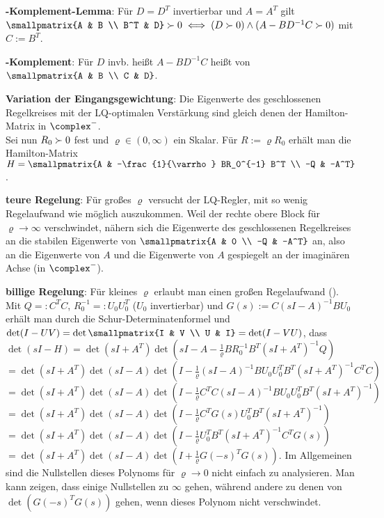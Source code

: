 \textbf{-Komplement-Lemma}:
Für $D = D^T$ invertierbar und $A = A^T$ gilt\\
$\smallpmatrix{A & B \\ B^T & D} \pd \iff (D \pd) \land (A - BD^{-1}C \pd)$
mit $C := B^T$.

\textbf{-Komplement}:
Für $D$ invb. heißt $A - BD^{-1}C$ heißt  von
$\smallpmatrix{A & B \\ C & D}$.

\linie

\textbf{Variation der Eingangsgewichtung}:
Die Eigenwerte des geschlossenen Regelkreises mit der LQ-optimalen Verstärkung sind gleich denen
der Hamilton-Matrix in $\complex^-$.\\
Sei nun $R_0 \succ 0$ fest und $\varrho \in (0, \infty)$ ein Skalar.
Für $R := \varrho R_0$ erhält man die Hamilton-Matrix
$H = \smallpmatrix{A & -\frac{1}{\varrho} BR_0^{-1} B^T \\ -Q & -A^T}$.

\textbf{teure Regelung}:
Für großes $\varrho$ versucht der LQ-Regler, mit so wenig Regelaufwand wie möglich auszukommen.
Weil der rechte obere Block für $\varrho \to \infty$ verschwindet, nähern sich die Eigenwerte
des geschlossenen Regelkreises an die stabilen Eigenwerte von
$\smallpmatrix{A & 0 \\ -Q & -A^T}$ an, also an die Eigenwerte von $A$ und die Eigenwerte von $A$
gespiegelt an der imaginären Achse (in $\complex^-$).

\textbf{billige Regelung}:
Für kleines $\varrho$ erlaubt man einen großen Regelaufwand
().
Mit $Q =: C^T C$, $R_0^{-1} =: U_0 U_0^T$ ($U_0$ invertierbar) und
$G(s) := C(sI - A)^{-1} BU_0$ erhält man durch die Schur-Determinatenformel
und $\det(I - UV) = \det\smallpmatrix{I & V \\ U & I} = \det(I - VU)$, dass
$\det(sI - H)
= \det(sI + A^T) \det(sI - A - \frac{1}{\varrho} BR_0^{-1}B^T (sI + A^T)^{-1} Q)$\\
$= \det(sI + A^T) \det(sI - A)
\det(I - \frac{1}{\varrho} (sI - A)^{-1} BU_0 U_0^T B^T (sI + A^T)^{-1} C^T C)$\\
$= \det(sI + A^T) \det(sI - A)
\det(I - \frac{1}{\varrho} C^T C (sI - A)^{-1} BU_0 U_0^T B^T (sI + A^T)^{-1})$\\
$= \det(sI + A^T) \det(sI - A)
\det(I - \frac{1}{\varrho} C^T G(s) U_0^T B^T (sI + A^T)^{-1})$\\
$= \det(sI + A^T) \det(sI - A)
\det(I - \frac{1}{\varrho} U_0^T B^T (sI + A^T)^{-1} C^T G(s))$\\
$= \det(sI + A^T) \det(sI - A)
\det(I + \frac{1}{\varrho} G(-s)^T G(s))$.
Im Allgemeinen sind die Nullstellen dieses Polynoms für $\varrho \to 0$ nicht einfach zu
analysieren.
Man kann zeigen, dass einige Nullstellen zu $\infty$ gehen, während andere zu denen von
$\det(G(-s)^T G(s))$ gehen, wenn dieses Polynom nicht verschwindet.

